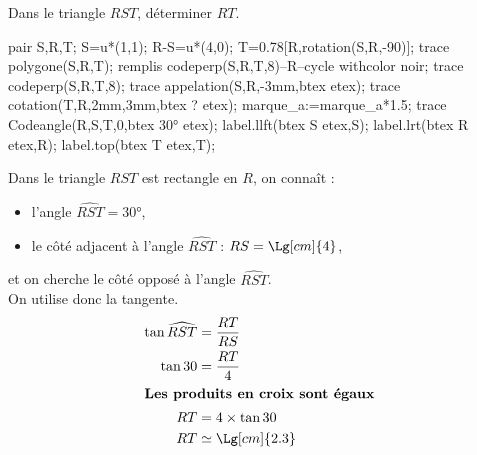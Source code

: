 \begin{methode*1}
    \exercice
    Dans le triangle $RST$, déterminer $RT$.\\
    \begin{Geometrie}[CoinHD={(6u,4.5u)}]        
        pair S,R,T;
        S=u*(1,1);
        R-S=u*(4,0);
        T=0.78[R,rotation(S,R,-90)];
        trace polygone(S,R,T);
        remplis codeperp(S,R,T,8)--R--cycle withcolor noir;
        trace codeperp(S,R,T,8);
        trace appelation(S,R,-3mm,btex  etex);  
        trace cotation(T,R,2mm,3mm,btex ? etex);
        marque_a:=marque_a*1.5;
        trace Codeangle(R,S,T,0,btex \ang{30} etex);
        label.llft(btex S etex,S);
        label.lrt(btex R etex,R);
        label.top(btex T etex,T);
    \end{Geometrie}
    \correction
    Dans le triangle $RST$ est rectangle en $R$, on connaît :
    \begin{itemize}        
        \item l'angle $\widehat{RST}=\ang{30}$,        
        \item le côté adjacent à l'angle $\widehat{RST}$ : $RS=\Lg[cm]{4}$,
    \end{itemize}
    et on cherche le côté opposé à l'angle $\widehat{RST}$.\\
    On utilise donc la tangente.
    \begin{align*}
        \tan\widehat{RST}&=\frac{RT}{RS}\\
        \tan30&=\frac{RT}{4}\\
        \intertext{\centering\bf Les produits en croix sont égaux}
        RT&=4\times\tan30\\
        RT&\simeq \Lg[cm]{2.3}
    \end{align*}
\end{methode*1}

